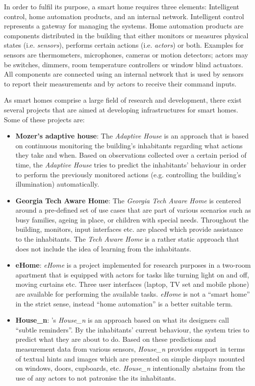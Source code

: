 In order to fulfil its purpose, a smart home requires three elements: Intelligent control, home automation products, and an internal network. Intelligent control represents a gateway for managing the systems. Home automation products are components distributed in the building that either monitors or measures physical states (i.e. \emph{sensors}), performs certain actions (i.e. \emph{actors}) or both. Examples for sensors are thermometers, microphones, cameras or motion detectors; actors may be switches, dimmers, room temperature controllers or window blind actuators. All components are connected using an internal network that is used by sensors to report their measurements and by actors to receive their command inputs.

As smart homes comprise a large field of research and development, there exist several projects that are aimed at developing infrastructures for smart homes. Some of these projects are:
\begin{itemize} %
  \item \textbf{Mozer's adaptive house}: The \emph{Adaptive House} is an approach that is based on continuous monitoring the building's inhabitants regarding what actions they take and when. Based on observations collected over a certain period of time, the \emph{Adaptive House} tries to predict the inhabitants' behaviour in order to perform the previously monitored actions (e.g. controlling the building's illumination) automatically.~\cite{adaptivehouse}
  \item \textbf{Georgia Tech Aware Home}: The \emph{Georgia Tech Aware Home} is centered around a pre-defined set of use cases that are part of various scenarios such as busy families, ageing in place, or children with special needs. Throughout the building, monitors, input interfaces etc. are placed which provide assistance to the inhabitants. The \emph{Tech Aware Home} is a rather static approach that does not include the idea of learning from the inhabitants.~\cite{techawarehome}
  \item \textbf{eHome}: \emph{eHome} is a project implemented for research purposes in a two-room apartment that is equipped with actors for tasks like turning light on and off, moving curtains etc. Three user interfaces (laptop, TV set and mobile phone) are available for performing the available tasks. \emph{eHome} is not a ``smart home'' in the strict sense, instead ``home automation'' is a better suitable term.~\cite{ehome}
  \item \textbf{House\_n}: 's \emph{House\_n} is an approach based on what its designers call ``subtle reminders''. By the inhabitants' current behaviour, the system tries to predict what they are about to do. Based on these predictions and measurement data from various sensors, \emph{House\_n} provides support in terms of textual hints and images which are presented on simple displays mounted on windows, doors, cupboards, etc. \emph{House\_n} intentionally abstains from the use of any actors to not patronise the its inhabitants.~\cite{housen}
\end{itemize}

